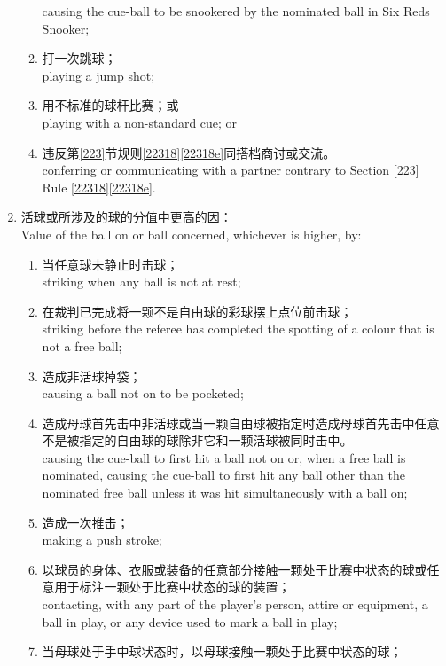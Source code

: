 \begin{enumerate}[label=(\alph*),start=1]
\begin{enumerate}[label=(\roman*)]
        causing the cue-ball to be snookered by the nominated ball in Six Reds Snooker;
        \item 打一次跳球；\\
        playing a jump shot;
        \item 用不标准的球杆比赛；或\\
        playing with a non-standard cue; or
        \item 违反第\ref{223}节规则\ref{22318}\ref{22318e}同搭档商讨或交流。\\
        conferring or communicating with a partner contrary to Section \ref{223} Rule \ref{22318}\ref{22318e}.
    \end{enumerate}
    \item \label{22311b}活球或所涉及的球的分值中更高的因：\\
    Value of the ball on or ball concerned, whichever is higher, by:
    \begin{enumerate}[label=(\roman*)]
        \item 当任意球未静止时击球；\\
        striking when any ball is not at rest;
        \item \label{22311bii}在裁判已完成将一颗不是自由球的彩球摆上点位前击球；\\
        striking before the referee has completed the spotting of a colour that is not a free ball;
        \item 造成非活球掉袋；\\
        causing a ball not on to be pocketed;
        \item 造成母球首先击中非活球或当一颗自由球被指定时造成母球首先击中任意不是被指定的自由球的球除非它和一颗活球被同时击中。\\
        causing the cue-ball to first hit a ball not on or, when a free ball is nominated, causing the cue-ball to first hit any ball other than the nominated free ball unless it was hit simultaneously with a ball on;
        \item 造成一次推击；\\
        making a push stroke;
        \item 以球员的身体、衣服或装备的任意部分接触一颗处于比赛中状态的球或任意用于标注一颗处于比赛中状态的球的装置；\\
        contacting, with any part of the player's person, attire or equipment, a ball in play, or any device used to mark a ball in play;
        \item 当母球处于手中球状态时，以母球接触一颗处于比赛中状态的球；\\

\end{enumerate}
\end{enumerate}
